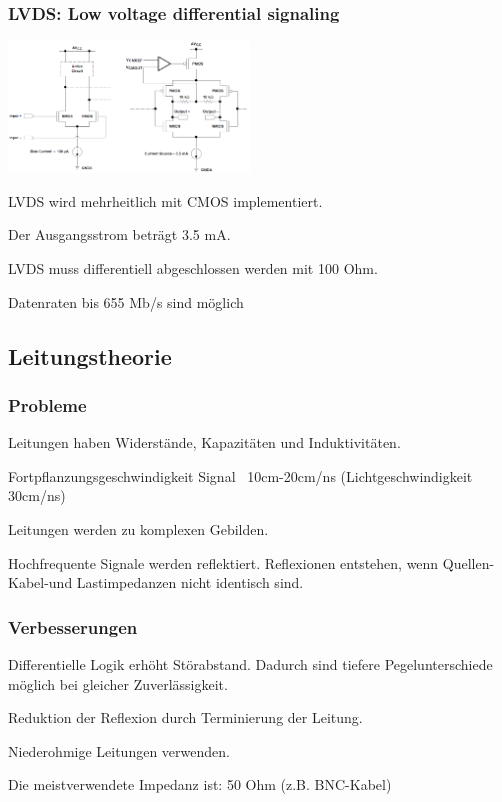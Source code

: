 \subsubsection{LVDS: Low voltage differential signaling}
\begin{multicols}{2}
    \includegraphics[width=0.48\textwidth]{images/lvds}
    \begin{compactitem}
        \item LVDS wird mehrheitlich mit CMOS implementiert.
        \item Der Ausgangsstrom beträgt 3.5 mA.
        \item LVDS muss differentiell abgeschlossen werden mit 100 Ohm.
        \item Datenraten bis 655 Mb/s sind möglich
    \end{compactitem}
\end{multicols}

\subsection{Leitungstheorie}
\subsubsection{Probleme}
\begin{compactitem}
    \item Leitungen haben Widerstände, Kapazitäten und Induktivitäten.
    \item Fortpflanzungsgeschwindigkeit Signal ~10cm-20cm/ns (Lichtgeschwindigkeit 30cm/ns)
    \item Leitungen werden zu komplexen Gebilden.
    \item Hochfrequente Signale werden reflektiert. Reflexionen entstehen, wenn Quellen-Kabel-und Lastimpedanzen nicht identisch sind.
\end{compactitem}

\subsubsection{Verbesserungen}
\begin{compactitem}
    \item Differentielle Logik erhöht Störabstand. Dadurch sind tiefere Pegelunterschiede möglich bei gleicher Zuverlässigkeit.
    \item Reduktion der Reflexion durch Terminierung der Leitung.
    \item Niederohmige Leitungen verwenden.
    \item Die meistverwendete Impedanz ist: 50 Ohm (z.B. BNC-Kabel)
\end{compactitem}